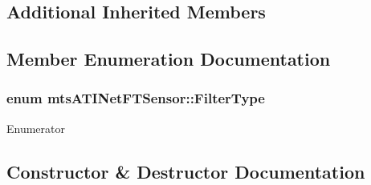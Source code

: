 \subsection*{Additional Inherited Members}


\subsection{Member Enumeration Documentation}
\hypertarget{classmts_a_t_i_net_f_t_sensor_ac0b6761b0eee98b4413c5a153865c2ea}{}
\subsubsection[{Filter\+Type}]{\setlength{\rightskip}{0pt plus 5cm}enum {\bf mts\+A\+T\+I\+Net\+F\+T\+Sensor\+::\+Filter\+Type}}\label{classmts_a_t_i_net_f_t_sensor_ac0b6761b0eee98b4413c5a153865c2ea}
\begin{Desc}
\item[Enumerator]\par
\begin{description}
\item[{\em 
\hypertarget{classmts_a_t_i_net_f_t_sensor_ac0b6761b0eee98b4413c5a153865c2eaab52493358557bae4766830c60064eec9}{}N\+O\+\_\+\+F\+I\+L\+T\+E\+R\label{classmts_a_t_i_net_f_t_sensor_ac0b6761b0eee98b4413c5a153865c2eaab52493358557bae4766830c60064eec9}
}]\end{description}
\end{Desc}


\subsection{Constructor \& Destructor Documentation}
\hypertarget{classmts_a_t_i_net_f_t_sensor_adf30efbe6a448cb9ca74dc734312f4b1}{}
